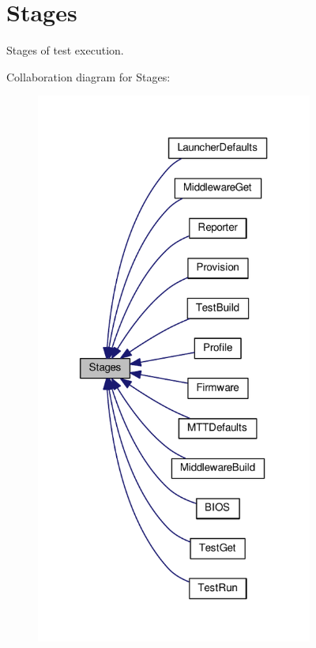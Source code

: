\hypertarget{group__Stages}{\section{Stages}
\label{group__Stages}
}


Stages of test execution.  


Collaboration diagram for Stages\-:
\nopagebreak
\begin{figure}[H]
\begin{center}
\leavevmode
\includegraphics[width=258pt]{group__Stages}
\end{center}
\end{figure}
